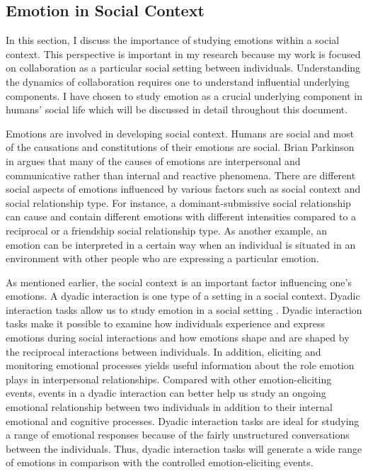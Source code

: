 \documentclass[12pt]{report}
\begin{document}
\subsection{Emotion in Social Context}
\label{section-emotion-social}

In this section, I discuss the importance of studying emotions within a social
context. This perspective is important in my research because my work is focused
on collaboration as a particular social setting between individuals.
Understanding the dynamics of collaboration requires one to understand
influential underlying components. I have chosen to study emotion as a crucial
underlying component in humans' social life which will be discussed in detail
throughout this document.

Emotions are involved in developing social context. Humans are social and most
of the causations and constitutions of their emotions are social. Brian
Parkinson in \cite{parkinson:emotions-social} argues that many of the causes of
emotions are interpersonal and communicative rather than internal and reactive
phenomena. There are different social aspects of emotions influenced by various
factors such as social context and social relationship type. For instance, a
dominant-submissive social relationship can cause and contain different emotions
with different intensities compared to a reciprocal or a friendship social
relationship type. As another example, an emotion can be interpreted in a
certain way when an individual is situated in an environment with other people
who are expressing a particular emotion.

As mentioned earlier, the social context is an important factor influencing
one's emotions. A dyadic interaction is one type of a setting in a social
context. Dyadic interaction tasks allow us to study emotion in a social setting
\cite{coan:emotion-dyadic}. Dyadic interaction tasks make it possible to examine
how individuals experience and express emotions during social interactions and
how emotions shape and are shaped by the reciprocal interactions between
individuals. In addition, eliciting and monitoring emotional processes yields
useful information about the role emotion plays in interpersonal relationships.
Compared with other emotion-eliciting events, events in a dyadic interaction can
better help us study an ongoing emotional relationship between two individuals
in addition to their internal emotional and cognitive processes. Dyadic
interaction tasks are ideal for studying a range of emotional responses because
of the fairly unstructured conversations between the individuals. Thus, dyadic
interaction tasks will generate a wide range of emotions in comparison with the
controlled emotion-eliciting events.
\end{document}
